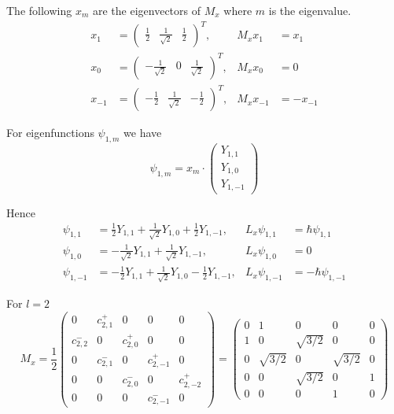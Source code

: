The following $x_m$ are the eigenvectors of $M_x$ where $m$ is the eigenvalue.
\begin{align*}
x_1&=\begin{pmatrix}\frac{1}{2} & \frac{1}{\sqrt2} & \frac{1}{2}\end{pmatrix}^T, & M_xx_1&=x_1
\\[1ex]
x_0&=\begin{pmatrix}-\frac{1}{\sqrt2} & 0 & \frac{1}{\sqrt2}\end{pmatrix}^T, & M_xx_0&=0
\\[1ex]
x_{-1}&=\begin{pmatrix}-\frac{1}{2} & \frac{1}{\sqrt2} & -\frac{1}{2}\end{pmatrix}^T, & M_xx_{-1}&=-x_{-1}
\end{align*}

For eigenfunctions $\psi_{1,m}$ we have
\begin{equation*}
\psi_{1,m}=x_m\cdot\begin{pmatrix}Y_{1,1}\\[1ex]Y_{1,0}\\[1ex]Y_{1,-1}\end{pmatrix}
\end{equation*}

Hence
\begin{align*}
\psi_{1,1}&=\frac{1}{2}Y_{1,1}+\frac{1}{\sqrt2}Y_{1,0}+\frac{1}{2}Y_{1,-1},
& L_x\psi_{1,1}&=\hbar\psi_{1,1}
\\[1ex]
\psi_{1,0}&=-\frac{1}{\sqrt2}Y_{1,1}+\frac{1}{\sqrt2}Y_{1,-1},
& L_x\psi_{1,0}&=0
\\[1ex]
\psi_{1,-1}&=-\frac{1}{2}Y_{1,1}+\frac{1}{\sqrt2}Y_{1,0}-\frac{1}{2}Y_{1,-1},
& L_x\psi_{1,-1}&=-\hbar\psi_{1,-1}
\end{align*}

For $l=2$
\begin{equation*}
M_x=\frac{1}{2}\begin{pmatrix}
0 & c_{2,1}^+ & 0 & 0 & 0
\\[1ex]
c_{2,2}^- & 0 & c_{2,0}^+ & 0 & 0
\\[1ex]
0 & c_{2,1}^- & 0 & c_{2,-1}^+ & 0
\\[1ex]
0 & 0 & c_{2,0}^- & 0 & c_{2,-2}^+
\\[1ex]
0 & 0 & 0 &c_{2,-1}^- & 0
\end{pmatrix}
=
\begin{pmatrix}
0 & 1 & 0 & 0 & 0
\\[1ex]
1 & 0 & \sqrt{3/2} & 0 & 0
\\[1ex]
0 & \sqrt{3/2} & 0 & \sqrt{3/2} & 0
\\[1ex]
0 & 0 & \sqrt{3/2} & 0 & 1
\\[1ex]
0 & 0 & 0 & 1 & 0
\end{pmatrix}
\end{equation*}

